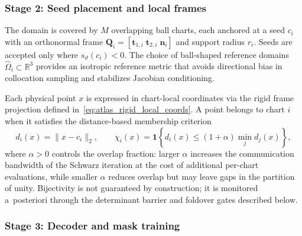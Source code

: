 \documentclass[sort&compress]{svjour3} %
\begin{document}
\subsubsection{Stage 2: Seed placement and local frames}
\label{sec:impl_seeds}

The domain is covered by $M$ overlapping ball charts, each anchored at a seed $c_i$ with an orthonormal frame $\mathbf{Q}_i=[\mathbf{t}_{1,i}\;\mathbf{t}_{2,i}\;\mathbf{n}_i]$ and support radius $r_i$. Seeds are accepted only where $s_\vartheta(c_i)<0$. The choice of ball-shaped reference domains $\widehat{\Omega}_i\subset\mathbb{R}^3$ provides an isotropic reference metric that avoids directional bias in collocation sampling and stabilizes Jacobian conditioning.

Each physical point $x$ is expressed in chart-local coordinates via the rigid frame projection defined in~\eqref{eq:atlas_rigid_local_coords}. A point belongs to chart $i$ when it satisfies the distance-based membership criterion
\begin{equation}
d_i(x)=\|x-c_i\|_2,
\qquad
\chi_i(x)=\mathbf{1}\!\left\{
d_i(x)\le (1+\alpha)\min_{j} d_j(x)
\right\},
\label{eq:impl_membership}
\end{equation}
where $\alpha>0$ controls the overlap fraction: larger $\alpha$ increases the communication bandwidth of the Schwarz iteration at the cost of additional per-chart evaluations, while smaller $\alpha$ reduces overlap but may leave gaps in the partition of unity. Bijectivity is not guaranteed by construction; it is monitored a~posteriori through the determinant barrier and foldover gates described below.

\subsubsection{Stage 3: Decoder and mask training}
\label{sec:impl_decoder}
\end{document}
